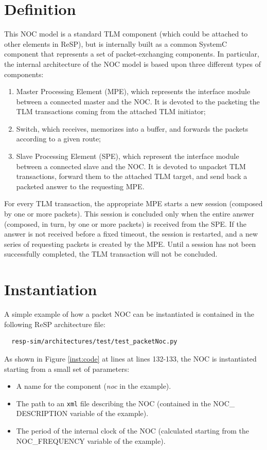 \documentclass[a4paper,11pt,oneside]{article}
\begin{document}
\section{Definition}
\label{def}
This NOC model is a standard TLM component (which could be attached to other elements in ReSP), but is internally built as a common SystemC component that represents a set of packet-exchanging components. In particular, the internal architecture of the NOC model is based upon three different types of components:
\begin{enumerate}
  \item Master Processing Element (MPE), which represents the interface module between a connected master and the NOC. It is devoted to the pa\-cketing the TLM transactions coming from the attached TLM initiator;
  \item Switch, which receives, memorizes into a buffer, and forwards the packets according to a given route;
  \item Slave Processing Element (SPE), which represent the interface module between a connected slave and the NOC. It is devoted to unpacket TLM tran\-sactions, forward them to the attached TLM target, and send back a packeted answer to the requesting MPE.
\end{enumerate}
For every TLM transaction, the appropriate MPE starts a new session (co\-mposed by one or more packets). This session is concluded only when the entire answer (composed, in turn, by one or more packets) is received from the SPE. If the answer is not received before a fixed timeout, the session is restarted, and a new series of requesting packets is created by the MPE. Until a session has not been successfully completed, the TLM transaction will not be concluded.

\section{Instantiation}
\label{inst}
A simple example of how a packet NOC can be instantiated is contained in the following ReSP architecture file:
\begin{verbatim}
  resp-sim/architectures/test/test_packetNoc.py
\end{verbatim}
As shown in Figure \ref{inst:code} at lines at lines 132-133, the NOC is instantiated starting from a small set of parameters:
\begin{itemize}
  \item A name for the component (\textit{noc} in the example).
  \item The path to an \texttt{xml} file describing the NOC (contained in the NOC\_ DESCRIPTION variable of the example).
  \item The period of the internal clock of the NOC (calculated starting from the NOC\_FREQUENCY variable of the example).
\end{itemize}
\end{document}
